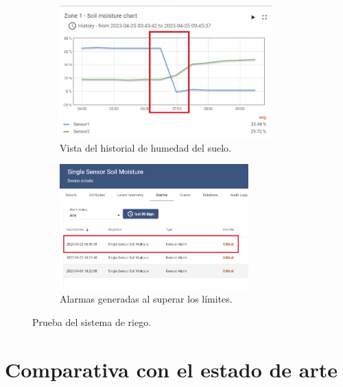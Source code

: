 \begin{figure}[!h]
     \centering
       \begin{subfigure}[b]{0.8\textwidth}
	    \centering
		 \includegraphics[width=0.9\textwidth]{./Figures/chapter4/soil_chart.jpg}
		\caption{Vista del historial de humedad del suelo.}
		\label{fig:soil_graph}
     \end{subfigure}
          \hfill
     \begin{subfigure}[b]{0.80\textwidth}
		\centering
		\includegraphics[width=0.80\textwidth]{./Figures/chapter4/soil_alarm.jpg}
		\caption{Alarmas generadas al superar los límites.}
		\label{fig:soil_alarm}
     \end{subfigure}
     \hfill
        \caption[Prueba del sistema de riego]{Prueba del sistema de riego.}
        \label{fig:tb_riego}
\end{figure}

\pagebreak
\section{Comparativa con el estado de arte}
\label{sec:Comparativa con el estado de arte}



